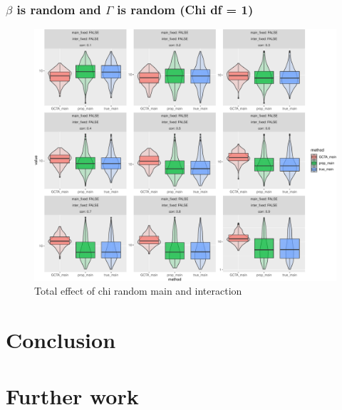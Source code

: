 \documentclass[]{article}
\begin{document}
\clearpage

\subsubsection{\texorpdfstring{\(\beta\) is random and \(\Gamma\) is
random (Chi df =
1)}{\textbackslash{}beta is random and \textbackslash{}Gamma is random (Chi df = 1)}}\label{beta-is-random-and-gamma-is-random-chi-df-1}

\begin{figure}
\centering
\includegraphics{Simulation_report_files/figure-latex/main_random_random_chi_combine_df_1-1.pdf}
\caption{Total effect of chi random main and interaction}
\end{figure}

\section{Conclusion}\label{conclusion}

\section{Further work}\label{further-work}
\end{document}
